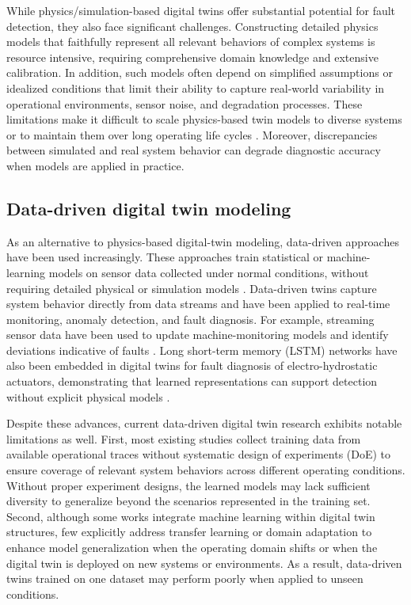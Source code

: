 \documentclass[a4paper,10pt]{cas-sc}%
\begin{document}
While physics/simulation-based digital twins offer substantial potential for fault detection, they also face significant challenges. Constructing detailed physics models that faithfully represent all relevant behaviors of complex systems is resource intensive, requiring comprehensive domain knowledge and extensive calibration. In addition, such models often depend on simplified assumptions or idealized conditions that limit their ability to capture real-world variability in operational environments, sensor noise, and degradation processes. These limitations make it difficult to scale physics-based twin models to diverse systems or to maintain them over long operating life cycles \citep{van2022predictive, ZHONG2023e14534}. Moreover, discrepancies between simulated and real system behavior can degrade diagnostic accuracy when models are applied in practice.


\subsection{Data-driven digital twin modeling}\label{sect:2.3}


As an alternative to physics-based digital-twin modeling, data-driven approaches have been used increasingly. These approaches train statistical or machine-learning models on sensor data collected under normal conditions, without requiring detailed physical or simulation models \citep{kreuzer2024artificial,nele2024towards, khan2025data}. Data-driven twins capture system behavior directly from data streams and have been applied to real-time monitoring, anomaly detection, and fault diagnosis. For example, streaming sensor data have been used to update machine-monitoring models and identify deviations indicative of faults \citep{cheruku2025data}. Long short-term memory (LSTM) networks have also been embedded in digital twins for fault diagnosis of electro-hydrostatic actuators, demonstrating that learned representations can support detection without explicit physical models \citep{rodriguez2024development}.


Despite these advances, current data-driven digital twin research exhibits notable limitations as well. First, most existing studies collect training data from available operational traces without systematic design of experiments (DoE) to ensure coverage of relevant system behaviors across different operating conditions. Without proper experiment designs, the learned models may lack sufficient diversity to generalize beyond the scenarios represented in the training set. Second, although some works integrate machine learning within digital twin structures, few explicitly address transfer learning or domain adaptation to enhance model generalization when the operating domain shifts or when the digital twin is deployed on new systems or environments. As a result, data-driven twins trained on one dataset may perform poorly when applied to unseen conditions.
\end{document}
